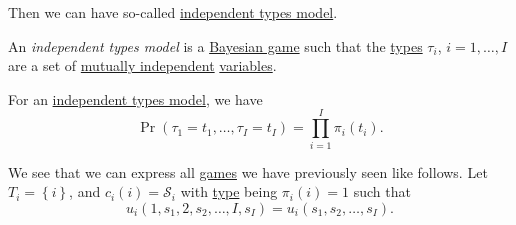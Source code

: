 Then we can have so-called \hyperref[def:independent-types-model]{independent types model}.
\begin{definition}\label{def:independent-types-model}
	An \emph{independent types model} is a \hyperref[def:mathematical-Bayesian-game]{Bayesian game} such that the \hyperref[def:type]{types} \(\tau _i\),
	\(i = 1, \ldots  , I\) are a set of \hyperref[def:independent]{mutually independent} \hyperref[def:random-variable]{variables}.
\end{definition}

\begin{remark}
	For an \hyperref[def:independent-types-model]{independent types model}, we have
	\[
		\Pr(\tau_{1} = t_1, \ldots , \tau_{I} = t_{I})=\prod\limits_{i = 1}^{I} \pi_{i}(t_{i}).
	\]
\end{remark}

We see that we can express all \hyperref[def:mathematical-game]{games} we have previously seen like follows. Let \(T_{i} = \left\{i\right\}\), and
\(c_{i}(i) = \mathcal{S}_{i}\) with \hyperref[def:type]{type} being \(\pi_i(i) = 1\) such that
\[
	u_{i}(1, s_1, 2, s_2, \ldots , I, s_I) = u_{i}(s_1, s_2, \ldots , s_I).
\]

